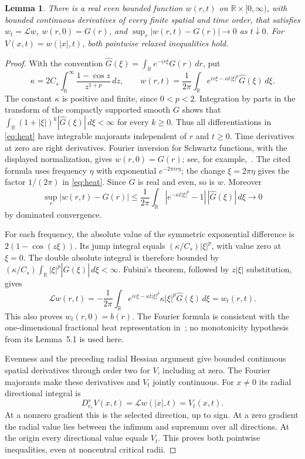 \documentclass[11pt]{article}
\newtheorem{lemma}{Lemma}
\newcommand{\R}{\mathbb R}
\newcommand{\Lop}{\mathcal L}
\begin{document}
\begin{lemma}\label{lem:heat}
There is a real even bounded function $w(r,t)$ on $\R\times[0,\infty)$,
with bounded continuous derivatives of every finite spatial and time order,
that satisfies $w_t=\Lop w$, $w(r,0)=G(r)$, and
$\sup_r|w(r,t)-G(r)|\to0$ as $t\downarrow0$.
For $V(x,t)=w(|x|,t)$, both pointwise relaxed inequalities hold.
\end{lemma}
\begin{proof}
With the convention $\widehat G(\xi)=\int_\R e^{-ir\xi}G(r)\,dr$, put
\begin{equation}\label{eq:heat}
 \kappa=2C_s\int_0^\infty\frac{1-\cos z}{z^{1+p}}\,dz,\qquad
 w(r,t)=\frac1{2\pi}\int_\R
 e^{ir\xi-\kappa t|\xi|^p}\widehat G(\xi)\,d\xi.
\end{equation}
The constant $\kappa$ is positive and finite, since $0<p<2$.
Integration by parts in the transform of the compactly supported smooth $G$
shows that $\int_\R(1+|\xi|)^k|\widehat G(\xi)|\,d\xi<\infty$ for every
$k\ge0$. Thus all differentiations in \eqref{eq:heat} have integrable
majorants independent of $r$ and $t\ge0$. Time derivatives at zero are right
derivatives. Fourier inversion for Schwartz functions, with the displayed
normalization, gives $w(r,0)=G(r)$; see, for example,~\cite[Section~3,
equation~(11)]{Tao}. The cited formula uses frequency $\eta$ with exponential $e^{-2\pi i r\eta}$;
the change $\xi=2\pi\eta$ gives the factor $1/(2\pi)$ in \eqref{eq:heat}.
Since $G$ is real and even, so is $w$.
Moreover
\[
 \sup_r|w(r,t)-G(r)|\le\frac1{2\pi}\int_\R
 |e^{-\kappa t|\xi|^p}-1|\,|\widehat G(\xi)|\,d\xi\longrightarrow0
\]
by dominated convergence.

For each frequency, the absolute value of the symmetric exponential
difference is $2(1-\cos(z\xi))$. Its jump integral equals
$(\kappa/C_s)|\xi|^p$, with value zero at $\xi=0$.
The double absolute integral is therefore bounded by
$(\kappa/C_s)\int_\R|\xi|^p|\widehat G(\xi)|\,d\xi<\infty$.
Fubini's theorem, followed by $z|\xi|$ substitution, gives
\[
 \Lop w(r,t)=-\frac1{2\pi}\int_\R
 e^{ir\xi-\kappa t|\xi|^p}\kappa|\xi|^p\widehat G(\xi)\,d\xi=w_t(r,t).
\]
This also proves $w_t(r,0)=b(r)$. The Fourier formula is consistent with the
one-dimensional fractional heat representation in~\cite[Section~5]{DEJV};
no monotonicity hypothesis from its Lemma~5.1 is used here.

Evenness and the preceding radial Hessian argument give bounded continuous
spatial derivatives through order two for $V$, including at zero. The
Fourier majorants make these derivatives and $V_t$ jointly continuous.
For $x\ne0$ its radial directional integral is
\[
 D_{e_r}^sV(x,t)=\Lop w(|x|,t)=V_t(x,t).
\]
At a nonzero gradient this is the selected direction, up to sign. At a zero
gradient the radial value lies between the infimum and supremum over all
directions. At the origin every directional value equals $V_t$. This proves
both pointwise inequalities, even at noncentral critical radii.
\end{proof}
\end{document}
